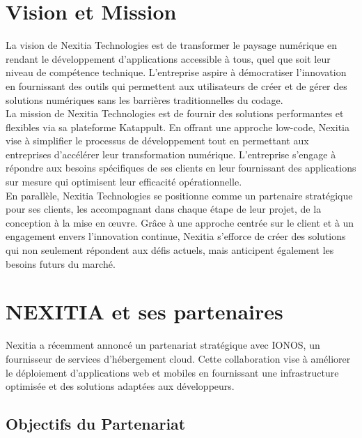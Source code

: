\documentclass[12pt]{report}
\begin{document}
				\section{Vision et Mission}

				\hspace{15pt} La vision de Nexitia Technologies est de transformer le paysage numérique en rendant le développement d'applications accessible à tous, quel que soit leur niveau de compétence technique. L’entreprise aspire à démocratiser l’innovation en fournissant des outils qui permettent aux utilisateurs de créer et de gérer des solutions numériques sans les barrières traditionnelles du codage.\\		

				La mission de Nexitia Technologies est de fournir des solutions performantes et flexibles via sa plateforme Katappult. En offrant une approche low-code, Nexitia vise à simplifier le processus de développement tout en permettant aux entreprises d'accélérer leur transformation numérique. L'entreprise s'engage à répondre aux besoins spécifiques de ses clients en leur fournissant des applications sur mesure qui optimisent leur efficacité opérationnelle.\\

				En parallèle, Nexitia Technologies se positionne comme un partenaire stratégique pour ses clients, les accompagnant dans chaque étape de leur projet, de la conception à la mise en œuvre. Grâce à une approche centrée sur le client et à un engagement envers l'innovation continue, Nexitia s'efforce de créer des solutions qui non seulement répondent aux défis actuels, mais anticipent également les besoins futurs du marché.

				\section{NEXITIA et ses partenaires}

				\hspace{15pt} Nexitia a récemment annoncé un partenariat stratégique avec IONOS, un fournisseur de services d'hébergement cloud. Cette collaboration vise à améliorer le déploiement d'applications web et mobiles en fournissant une infrastructure optimisée et des solutions adaptées aux développeurs.

				\subsection{Objectifs du Partenariat}
\end{document}
